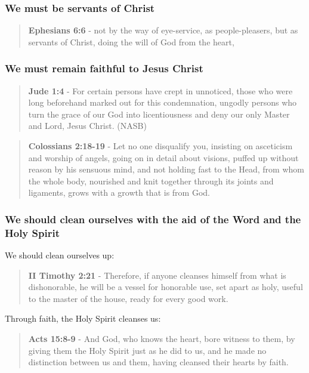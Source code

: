 \documentclass[11pt]{article}
\begin{document}
\subsubsection{We must be servants of Christ}
\label{sec:org98916af}

\begin{quote}
\textbf{Ephesians 6:6} - not by the way of eye-service, as people-pleasers, but as servants of Christ, doing the will of God from the heart,
\end{quote}

\subsubsection{We must remain faithful to Jesus Christ}
\label{sec:org6326db7}

\begin{quote}
\textbf{Jude 1:4} - For certain persons have crept in unnoticed, those who were long beforehand marked out for this condemnation, ungodly persons who turn the grace of our God into licentiousness and deny our only Master and Lord, Jesus Christ. (NASB)
\end{quote}

\begin{quote}
\textbf{Colossians 2:18-19} - Let no one disqualify you, insisting on asceticism and worship of angels, going on in detail about visions, puffed up without reason by his sensuous mind, and not holding fast to the Head, from whom the whole body, nourished and knit together through its joints and ligaments, grows with a growth that is from God.
\end{quote}

\subsubsection{We should clean ourselves with the aid of the Word and the Holy Spirit}
\label{sec:orgb0ea1a6}
We should clean ourselves up:

\begin{quote}
\textbf{II Timothy 2:21} - Therefore, if anyone cleanses himself from what is dishonorable, he will be a vessel for honorable use, set apart as holy, useful to the master of the house, ready for every good work.
\end{quote}

Through faith, the Holy Spirit cleanses us:

\begin{quote}
\textbf{Acts 15:8-9} - And God, who knows the heart, bore witness to them, by giving them the Holy Spirit just as he did to us, and he made no distinction between us and them, having cleansed their hearts by faith.
\end{quote}
\end{document}
